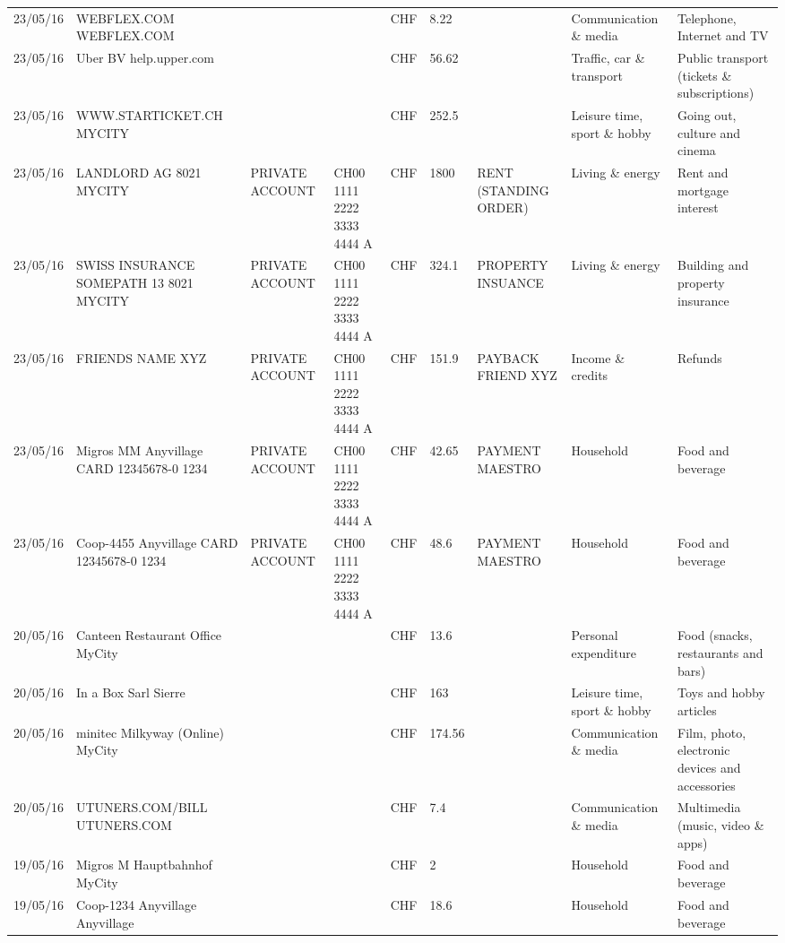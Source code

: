 \begin{landscape}
\begin{adjustwidth}{-2cm}{-2cm}
\begin{tiny}
\begin{longtable}{lp{4cm}llllp{3cm}ll}
		23/05/16 & WEBFLEX.COM              WEBFLEX.COM &       &       & CHF   & 8.22  &       & Communication \& media & Telephone,  Internet and TV \\
		23/05/16 & Uber BV                  help.upper.com &       &       & CHF   & 56.62 &       & Traffic, car \& transport & Public transport (tickets \& subscriptions) \\
		23/05/16 & WWW.STARTICKET.CH        MYCITY &       &       & CHF   & 252.5 &       & Leisure time, sport \& hobby & Going out, culture and cinema \\
		23/05/16 & LANDLORD AG 8021 MYCITY & PRIVATE ACCOUNT & CH00 1111 2222 3333 4444 A & CHF   & 1800  & RENT (STANDING ORDER) & Living \& energy & Rent and mortgage interest \\
		23/05/16 & SWISS INSURANCE SOMEPATH 13 8021 MYCITY & PRIVATE ACCOUNT & CH00 1111 2222 3333 4444 A & CHF   & 324.1 & PROPERTY INSUANCE & Living \& energy & Building and property insurance \\
		23/05/16 & FRIENDS NAME XYZ & PRIVATE ACCOUNT & CH00 1111 2222 3333 4444 A & CHF   & 151.9 & PAYBACK FRIEND XYZ & Income \& credits & Refunds \\
		23/05/16 & Migros MM Anyvillage CARD 12345678-0 1234 & PRIVATE ACCOUNT & CH00 1111 2222 3333 4444 A & CHF   & 42.65 & PAYMENT MAESTRO & Household & Food and beverage \\
		23/05/16 & Coop-4455 Anyvillage CARD 12345678-0 1234 & PRIVATE ACCOUNT & CH00 1111 2222 3333 4444 A & CHF   & 48.6  & PAYMENT MAESTRO & Household & Food and beverage \\
		20/05/16 & Canteen Restaurant Office      MyCity &       &       & CHF   & 13.6  &       & Personal expenditure & Food (snacks, restaurants and bars) \\
		20/05/16 & In a Box Sarl            Sierre &       &       & CHF   & 163   &       & Leisure time, sport \& hobby & Toys and hobby articles \\
		20/05/16 & minitec Milkyway (Online) MyCity &       &       & CHF   & 174.56 &       & Communication \& media & Film, photo, electronic devices and accessories \\
		20/05/16 & UTUNERS.COM/BILL          UTUNERS.COM &       &       & CHF   & 7.4   &       & Communication \& media & Multimedia (music, video \& apps) \\
		19/05/16 & Migros M Hauptbahnhof    MyCity &       &       & CHF   & 2     &       & Household & Food and beverage \\
		19/05/16 & Coop-1234 Anyvillage    Anyvillage &       &       & CHF   & 18.6  &       & Household & Food and beverage \\

\end{longtable}
\end{tiny}
\end{adjustwidth}
\end{landscape}
